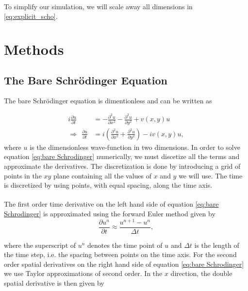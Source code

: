 \documentclass[english,notitlepage,reprint,nofootinbib]{revtex4-2}  %
\begin{document}
	\noindent
	To simplify our simulation, we will scale away all dimensions in \eqref{eq:explicit_scho}.
	
	\section{Methods}\label{sec:methods}
	\subsection{The Bare Schrödinger Equation}
	\noindent
	The bare Schrödinger equation is dimentionless and can be written as 

	\begin{equation}\label{eq:bare Schrodinger}
		\begin{split}
		i \frac{\partial u}{\partial t} &= -\frac{\partial^2 u}{\partial x^2} - \frac{\partial^2 u}{\partial y^2} + v(x,y) u\\
		\Rightarrow \ \ \frac{\partial u}{\partial t} &= i\left(\frac{\partial^2 u}{\partial x^2} + \frac{\partial^2 u}{\partial y^2}\right) - iv(x,y) u,
		\end{split}
	\end{equation} 
	where $u$ is the dimensionless wave-function in two dimensions.
	In order to solve equation \ref{eq:bare Schrodinger} numerically, we must discetize all the terms and approximate
	the derivatives. The discretization is done by introducing a grid of points in the
	$xy$ plane containing all the values of $x$ and $y$ we will use. The time is discretized by using points, with equal spacing, along the time axis.\\ \\
	The first order time derivative on the left hand side of equation \ref{eq:bare Schrodinger} is approximated using the forward Euler method given by
	\begin{equation}
		\frac{\partial u^{n}}{\partial t} \approx \frac{u^{n+1}-u^n}{\Delta t},
	\end{equation}

	\noindent
	where the superscript of $u^n$ denotes the time point of $u$ and $\Delta t$ is the length of the time
	step, i.e. the spacing between points on the time axis.	For the second order spatial derivatives
	on the right hand side of equation \ref{eq:bare Schrodinger}
	we use Taylor approximations of second order. In the $x$ direction,
	the double spatial derivative is then given by
	
\end{document}
